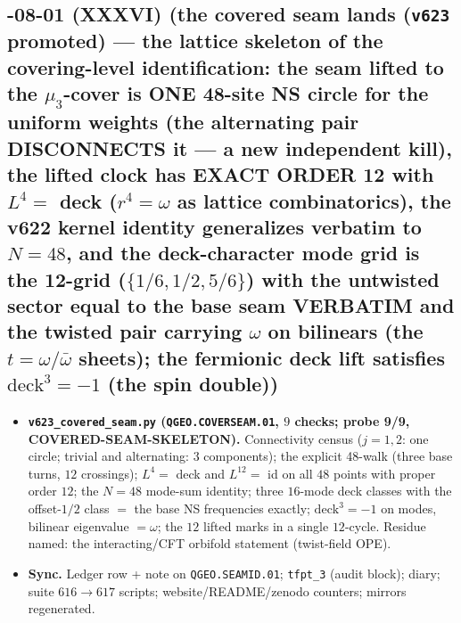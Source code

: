 \documentclass[11pt]{article}
\begin{document}
\subsection*{-08-01 (XXXVI) (the covered seam lands (\texttt{v623} promoted) --- the lattice skeleton of the covering-level identification: the seam lifted to the $\mu_3$-cover is ONE 48-site NS circle for the uniform weights (the alternating pair DISCONNECTS it --- a new independent kill), the lifted clock has EXACT ORDER 12 with $L^4=$ deck ($r^4=\omega$ as lattice combinatorics), the v622 kernel identity generalizes verbatim to $N=48$, and the deck-character mode grid is the 12-grid ($\{1/6,1/2,5/6\}$) with the untwisted sector equal to the base seam VERBATIM and the twisted pair carrying $\omega$ on bilinears (the $t=\omega/\bar\omega$ sheets); the fermionic deck lift satisfies $\mathrm{deck}^3=-1$ (the spin double))}
\begin{itemize}[leftmargin=1.5em]
\item \textbf{\texttt{v623\_covered\_seam.py} (\texttt{QGEO.COVERSEAM.01}, $9$ checks; probe
9/9, COVERED-SEAM-SKELETON).} Connectivity census ($j=1,2$: one circle; trivial and
alternating: $3$ components); the explicit 48-walk (three base turns, $12$ crossings);
$L^4=$ deck and $L^{12}=$ id on all $48$ points with proper order $12$; the $N=48$
mode-sum identity; three $16$-mode deck classes with the offset-$1/2$ class $=$ the base
NS frequencies exactly; $\mathrm{deck}^3=-1$ on modes, bilinear eigenvalue $=\omega$;
the $12$ lifted marks in a single $12$-cycle.  Residue named: the interacting/CFT
orbifold statement (twist-field OPE).
\item \textbf{Sync.} Ledger row + note on \texttt{QGEO.SEAMID.01}; \texttt{tfpt\_3}
(audit block); diary; suite $616\to617$ scripts; website/README/zenodo counters;
mirrors regenerated.
\end{itemize}
\end{document}
